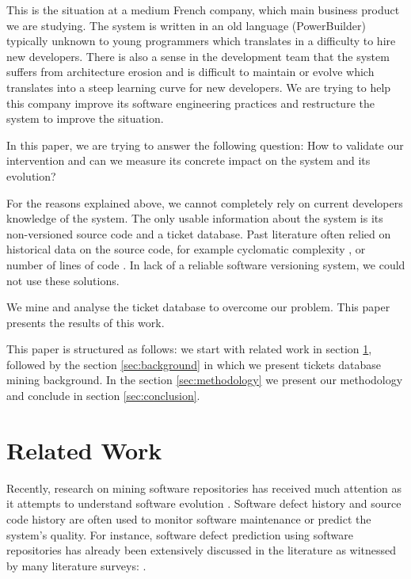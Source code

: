 \documentclass[10pt,conference]{IEEEtran}
\begin{document}
This is the situation at a medium French company, which main business product we are studying.
The system is written in an old language (PowerBuilder) typically unknown to young programmers which translates in a difficulty to hire new developers.
There is also a sense in the development team that the system suffers from architecture erosion and is difficult to maintain or evolve which translates into a steep learning curve for new developers.
We are trying to help this company improve its software engineering practices and restructure the system to improve the situation.


In this paper, we are trying to answer the following question:
How to validate our intervention and can we measure its concrete impact on the system and its evolution?

For the reasons explained above, we cannot completely rely on current developers knowledge of the system.
The only usable information about the system is its non-versioned source code and a ticket database.
Past literature often relied on historical data on the source code, for example
cyclomatic complexity \citep*{gill91}, or number of lines of code \citep*{port18}.
In lack of a reliable software versioning system, we could not use these solutions.


We mine and analyse the ticket database to overcome our problem.
This paper presents the results of this work.

 This paper is structured as follows: we start with related work in section \ref{sec:related-work}, followed by the section \ref{sec:background} in which we present tickets database mining background. 
 In the section \ref{sec:methodology} we present our methodology and conclude in section \ref{sec:conclusion}.
 
\section{Related Work}
\label{sec:related-work}

Recently, research on mining software repositories has received much attention as it attempts to understand software evolution \citep*{Zhan10a}.
Software defect history and source code history are often used to monitor software maintenance or predict the system's quality. 
For instance, software defect prediction using software repositories has already been extensively discussed in the literature as witnessed by many literature surveys: \citep*{Catal09,Hall12,Hoss17,Li19a,malh15}.
\end{document}
